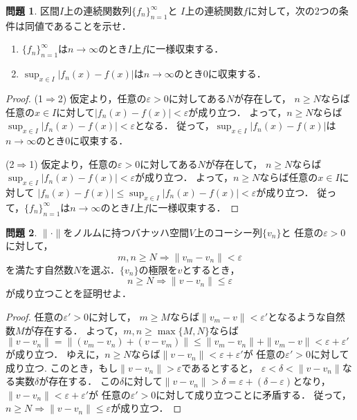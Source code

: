 \documentclass{jsarticle}
\theoremstyle{definition}
\newtheorem{qst}{問題}
\begin{document}
\begin{qst}
区間$I$上の連続関数列$\{f_n\}_{n=1}^\infty$と
$I$上の連続関数$f$に対して，次の2つの条件は同値であることを示せ．
\begin{enumerate}
\item$\{f_n\}_{n=1}^\infty$は$n\to\infty$のとき$I$上$f$に一様収束する．
\item$\displaystyle\sup_{x\in I}|f_n(x)-f(x)|$は$n\to\infty$のとき0に収束する．
\end{enumerate}
\end{qst}
\begin{proof}
(1$\Rightarrow$2)
仮定より，任意の$\varepsilon>0$に対してある$N$が存在して，
$n\geq N$ならば任意の$x\in I$に対して$|f_n(x)-f(x)|<\varepsilon$が成り立つ．
よって，$n\geq N$ならば$\displaystyle\sup_{x\in I}|f_n(x)-f(x)|<\varepsilon$となる．
従って，$\displaystyle\sup_{x\in I}|f_n(x)-f(x)|$は$n\to\infty$のとき0に収束する．

(2$\Rightarrow$1)
仮定より，任意の$\varepsilon>0$に対してある$N$が存在して，
$n\geq N$ならば$\displaystyle\sup_{x\in I}|f_n(x)-f(x)|<\varepsilon$が成り立つ．
よって，$n\geq N$ならば任意の$x\in I$に対して
$|f_n(x)-f(x)|\leq\displaystyle\sup_{x\in I}|f_n(x)-f(x)|<\varepsilon$が成り立つ．
従って，$\{f_n\}_{n=1}^\infty$は$n\to\infty$のとき$I$上$f$に一様収束する．
\end{proof}

\begin{qst}
$\|\cdot\|$をノルムに持つバナッハ空間$V$上のコーシー列$\{v_n\}$と
任意の$\varepsilon>0$に対して，
\[ m,n\geq N\Rightarrow\|v_m-v_n\|<\varepsilon \]
を満たす自然数$N$を選ぶ．$\{v_n\}$の極限を$v$とするとき，
\[ n\geq N\Rightarrow\|v-v_n\|\leq\varepsilon \]
が成り立つことを証明せよ．
\end{qst}
\begin{proof}
任意の$\varepsilon'>0$に対して，
$m\geq M$ならば$\|v_m-v\|<\varepsilon'$となるような自然数$M$が存在する．
よって，$m,n\geq\max\{M,N\}$ならば
$\|v-v_n\|=\|(v_m-v_n)+(v-v_m)\|\leq\|v_m-v_n\|+\|v_m-v\|<\varepsilon+\varepsilon'$
が成り立つ．
ゆえに，$n\geq N$ならば$\|v-v_n\|<\varepsilon+\varepsilon'$が
任意の$\varepsilon'>0$に対して成り立つ.
このとき，もし$\|v-v_n\|>\varepsilon$であるとすると，
$\varepsilon<\delta<\|v-v_n\|$なる実数$\delta$が存在する．
この$\delta$に対して$\|v-v_n\|>\delta=\varepsilon+(\delta-\varepsilon)$となり，
$\|v-v_n\|<\varepsilon+\varepsilon'$が
任意の$\varepsilon'>0$に対して成り立つことに矛盾する．
従って，$n\geq N\Rightarrow\|v-v_n\|\leq\varepsilon$が成り立つ．
\end{proof}
\end{document}
